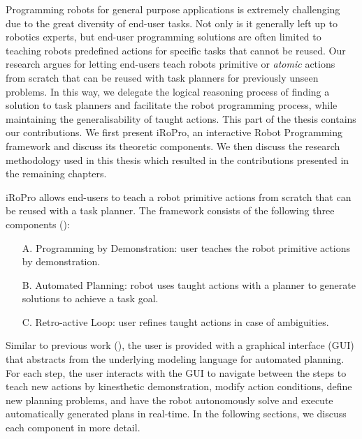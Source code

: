 Programming robots for general purpose applications is extremely challenging due to the great diversity of end-user tasks.
Not only is it generally left up to robotics experts, but end-user programming solutions are often limited to teaching robots predefined actions for specific tasks that cannot be reused.
Our research argues for letting end-users teach robots primitive or \textit{atomic} actions from scratch that can be reused with task planners for previously unseen problems.
In this way, we delegate the logical reasoning process of finding a solution to task planners and facilitate the robot programming process, while maintaining the generalisability of taught actions.
This part of the thesis contains our contributions.
We first present iRoPro, an interactive Robot Programming framework and discuss its theoretic components.
We then discuss the research methodology used in this thesis which resulted in the contributions presented in the remaining chapters.

iRoPro allows end-users to teach a robot primitive actions from scratch that can be reused with a task planner.
The framework consists of the following three components (): 
\begin{enumerate}
	\item[A.]{Programming by Demonstration: user teaches the robot primitive actions by demonstration.}
	\item[B.]{Automated Planning: robot uses taught actions with a planner to generate solutions to achieve a task goal.}
	\item[C.]{Retro-active Loop: user refines taught actions in case of ambiguities.}
\end{enumerate}
Similar to previous work (\cite{perzylo2016intuitive}), the user is provided with a graphical interface (GUI) that abstracts from the underlying modeling language for automated planning.
For each step, the user interacts with the GUI to navigate between the steps to teach new actions by kinesthetic demonstration, modify action conditions, define new planning problems, and have the robot autonomously solve and execute automatically generated plans in real-time.
In the following sections, we discuss each component in more detail. 

